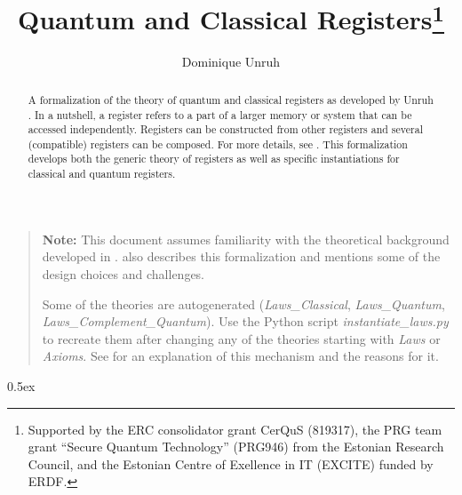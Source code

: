 \documentclass{article}
\begin{document}
\title{Quantum and Classical Registers\thanks{Supported by the ERC consolidator grant CerQuS (819317), the PRG team grant “Secure Quantum Technology” (PRG946) from the Estonian Research Council, and the Estonian Centre of Exellence in IT (EXCITE) funded by ERDF.}}
\author{Dominique Unruh}
\maketitle

\begin{abstract}
  A formalization of the theory of quantum and classical registers as
  developed by Unruh \cite{unruh21registers}. In a nutshell, a
  register refers to a part of a larger memory or system that can be
  accessed independently.  Registers can be constructed from other
  registers and several (compatible) registers can be composed. For
  more details, see \cite{unruh21registers}. This formalization
  develops both the generic theory of registers as well as specific
  instantiations for classical and quantum registers.
\end{abstract}

\bigskip
\bigskip

\begin{quote}
  \textbf{Note:} This document assumes familiarity with the theoretical background developed in \cite{unruh21registers}.
  \cite{unruh21registers} also describes this formalization and mentions some of the design choices and challenges.

  Some of the theories are autogenerated (\textit{Laws\_Classical}, \textit{Laws\_Quantum}, \textit{Laws\_Complement\_Quantum}).
  Use the Python script \textit{instantiate\_laws.py} to recreate them after changing any of the theories starting with \textit{Laws} or \textit{Axioms}.
  See \cite{unruh21registers} for an explanation of this mechanism and the reasons for it.
\end{quote}

\tableofcontents

\parindent 0pt\parskip 0.5ex





\end{document}
